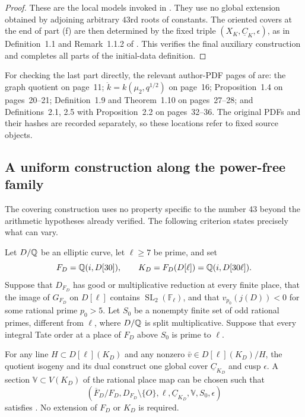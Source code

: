 \begin{proof}
These are the local models invoked in
\cite[Definition~3.1(e)]{IUT1}. They use no global extension
obtained by adjoining arbitrary $43$rd roots of constants. The
oriented covers at the end of part (f) are then determined by
the fixed triple $(X_K,\underline C_K,\epsilon)$, as in
Definition~1.1 and Remark~1.1.2 of \cite{IUT1}. This verifies
the final auxiliary construction and completes all parts of the
initial-data definition.
\end{proof}

For checking the last part directly, the relevant author-PDF pages
of \cite{MochEtaleTheta} are: the graph quotient on page~11;
$\ddot k=k(\mu_2,q^{1/2})$ on page~16; Proposition~1.4 on
pages~20--21; Definition~1.9 and Theorem~1.10 on pages~27--28;
and Definitions~2.1, 2.5 with Proposition~2.2 on pages~32--36.
The original PDFs and their hashes are recorded separately, so
these locations refer to fixed source objects.

\subsection{A uniform construction along the power-free family}

The covering construction uses no property specific to the number
43 beyond the arithmetic hypotheses already verified. The following
criterion states precisely what can vary.

\begin{proposition}
\label{prop:itd-criterion}
Let $D/\mathbb Q$ be an elliptic curve, let $\ell\ge7$ be prime, and set
\[
 F_D=\mathbb Q(i,D[30]),\qquad
 K_D=F_D(D[\ell])=\mathbb Q(i,D[30\ell]).
\]
Suppose that $D_{F_D}$ has good or multiplicative reduction at every
finite place, that the image of $G_{F_D}$ on $D[\ell]$ contains
$\operatorname{SL}_2(\mathbb F_\ell)$, and that
$v_{p_0}(j(D))<0$ for some rational prime $p_0>5$.
Let $S_0$ be a nonempty finite set of odd rational primes, different
from $\ell$, where $D/\mathbb Q$ is split multiplicative. Suppose that
every integral Tate order at a place of $F_D$ above $S_0$ is prime
to $\ell$.

For any line $H\subset D[\ell](K_D)$ and any nonzero
$\bar v\in D[\ell](K_D)/H$, the quotient isogeny and its dual
construct one global cover $\underline C_{K_D}$ and cusp
$\epsilon$. A section $\mathbb V\subset V(K_D)$ of the rational
place map can be chosen such that
\[
 (\overline F_D/F_D,D_{F_D}\setminus\{O\},\ell,
       \underline C_{K_D},\mathbb V,S_0,\epsilon)
\]
satisfies \cite[Definition~3.1(a)--(f)]{IUT1}.
No extension of $F_D$ or $K_D$ is required.
\end{proposition}

